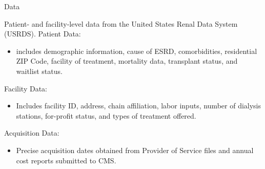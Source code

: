 \begin{frame}{Data}

Patient- and facility-level data from the United States Renal Data System (USRDS).
Patient Data:
\begin{itemize}
    \item  includes demographic information, cause of ESRD, comorbidities, residential ZIP Code, facility of treatment, mortality data, transplant status, and waitlist status.
\end{itemize}
Facility Data:
\begin{itemize}
    \item Includes facility ID, address, chain affiliation, labor inputs, number of dialysis stations, for-profit status, and types of treatment offered.
\end{itemize}

Acquisition Data:
\begin{itemize}
    \item Precise acquisition dates obtained from Provider of Service files and annual cost reports submitted to CMS.
\end{itemize}

\end{frame}